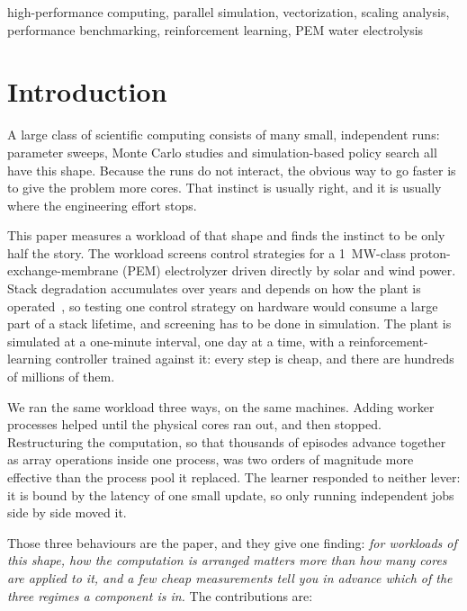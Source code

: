 \documentclass[conference]{IEEEtran}
\begin{document}
\begin{IEEEkeywords}
high-performance computing, parallel simulation, vectorization, scaling analysis, performance benchmarking,
reinforcement learning, PEM water electrolysis
\end{IEEEkeywords}

\section{Introduction}
A large class of scientific computing consists of many small, independent runs: parameter sweeps, Monte Carlo
studies and simulation-based policy search all have this shape. Because the runs do not interact, the obvious way
to go faster is to give the problem more cores. That instinct is usually right, and it is usually where the
engineering effort stops.

This paper measures a workload of that shape and finds the instinct to be only half the story. The workload screens
control strategies for a \SI{1}{\mega\watt}-class proton-exchange-membrane (PEM) electrolyzer driven directly by
solar and wind power. Stack degradation accumulates over years and depends on how the plant is
operated~\cite{sayedahmed2024dynamic,feng2017pemwe,bernhardt2026degradation}, so testing one control strategy on
hardware would consume a large part of a stack lifetime, and screening has to be done in simulation. The plant is
simulated at a one-minute interval, one day at a time, with a reinforcement-learning controller trained against it:
every step is cheap, and there are hundreds of millions of them.

We ran the same workload three ways, on the same machines. Adding worker processes helped until the physical cores
ran out, and then stopped. Restructuring the computation, so that thousands of episodes advance together as array
operations inside one process, was two orders of magnitude more effective than the process pool it replaced. The
learner responded to neither lever: it is bound by the latency of one small update, so only running independent
jobs side by side moved it.

Those three behaviours are the paper, and they give one finding: \emph{for workloads of this shape, how the
computation is arranged matters more than how many cores are applied to it, and a few cheap measurements tell you
in advance which of the three regimes a component is in.} The contributions are:
\end{document}
